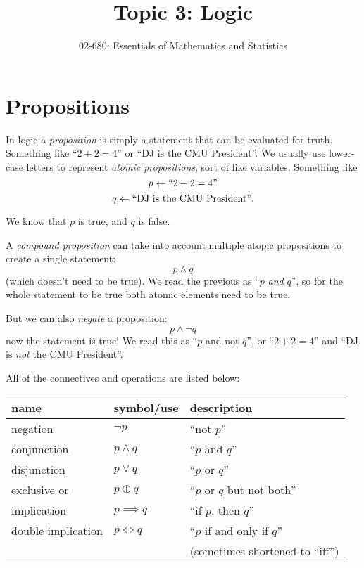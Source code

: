 \documentclass[11pt, oneside]{article}   	%
\title{Topic 3:  Logic}
\author{02-680: Essentials of Mathematics and Statistics}
\begin{document}
\maketitle

\section{Propositions}
In logic a \emph{proposition} is simply a statement that can be evaluated for truth. 
Something like ``$2+2=4$'' or ``DJ is the CMU President''. 
We usually use lower-case letters to represent \emph{atomic propositions}, sort of like variables. 
Something like 
\[ p \leftarrow \textnormal{``}2+2=4\textnormal{''}\]
\[ q \leftarrow \textnormal{``DJ is the CMU President''}.\]

We know that $p$ is true, and $q$ is false. 

A \emph{compound proposition} can take into account multiple atopic propositions to create a single statement: 
\[ p \wedge q \]
(which doesn't need to be true). 
We read the previous as ``$p$ \textit{and} $q$'', 
so for the whole statement to be true both atomic elements need to be true. 
 
But we can also \textit{negate} a proposition: 
\[ p \wedge \neg q \]
now the statement is true! 
We read this as ``$p$ and not $q$'', 
or  ``$2+2=4$'' and  ``DJ is \emph{not} the CMU President''.

All of the connectives and operations are listed below: 
\begin{center}
\begin{tabular}{lll}
name 		& symbol/use 		& description\\
\hline 
\hline
negation			& $\neg p$		& ``not $p$''\\
\hline
conjunction		& $p \wedge q$		& ``$p$ and $q$''\\
disjunction		& $p \vee q$		& ``$p$ or $q$''\\
exclusive or		& $p \oplus q$		& ``$p$ or $q$ but not both''\\
\hline
implication		& $p \implies q$	& ``if $p$, then $q$''\\
double implication 	& $p \iff q$		& ``$p$ if and only if $q$'' \\
				&				& \hspace{3em}(sometimes shortened to ``iff'')\\
\hline
\end{tabular}
\end{center}
\end{document}
